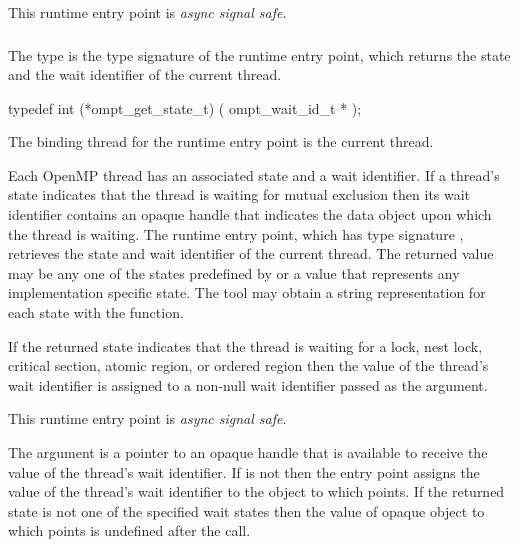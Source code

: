 This runtime entry point is \emph{async signal safe}.



\subsubsection{}
\label{sec:ompt_get_state_t}
\label{sec:ompt_get_state}

\summary
The  type is the type signature of the 
 runtime entry point, which returns the
state and the wait identifier of the current thread.

\format
\begin{ccppspecific}
\begin{omptInquiry}
typedef int (*ompt_get_state_t) (
  ompt_wait_id_t *
);
\end{omptInquiry}
\end{ccppspecific}

\binding
The binding thread for the  runtime entry point 
is the current thread.

\descr
Each OpenMP thread has an associated state and a wait identifier. If
a thread's state indicates that the thread is waiting for mutual exclusion
then its wait identifier contains an opaque handle that indicates the 
data object upon which the thread is waiting. The  
runtime entry point, which has type signature ,
retrieves the state and wait identifier of the current thread.
The returned value may be any one of the states predefined by 
 or a value that represents any implementation
specific state. The tool may obtain a string representation for each 
state with the  function.

If the returned state indicates that the thread is waiting for a
lock, nest lock, critical section, atomic region, or ordered region
then the value of the thread's wait identifier is assigned to a
non-null wait identifier passed as the  argument.

This runtime entry point is \emph{async signal safe}.

\argdesc
The  argument is a pointer to an opaque handle that is
available to receive the value of the thread's wait identifier. If
 is not  then the entry point assigns the 
value of the thread's wait identifier to the object to which 
 points. If the returned state is not one of the specified
wait states then the value of opaque object to which  points
is undefined after the call.


